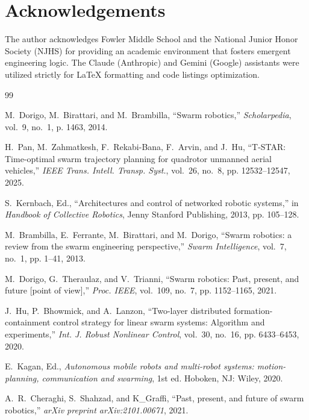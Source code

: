 \documentclass[letterpaper, 10pt, conference]{IEEEtran}
\begin{document}
\section*{Acknowledgements}
The author acknowledges Fowler Middle School and the National Junior Honor Society (NJHS) for providing an academic environment that fosters emergent engineering logic. The Claude (Anthropic) and Gemini (Google) assistants were utilized strictly for LaTeX formatting and code listings optimization.

\begin{thebibliography}{99}

M.~Dorigo, M.~Birattari, and M.~Brambilla, ``Swarm robotics,'' \emph{Scholarpedia}, vol.~9, no.~1, p. 1463, 2014.

H.~Pan, M.~Zahmatkesh, F.~Rekabi-Bana, F.~Arvin, and J.~Hu, ``T-STAR: Time-optimal swarm trajectory planning for quadrotor unmanned aerial vehicles,'' \emph{IEEE Trans. Intell. Transp. Syst.}, vol.~26, no.~8, pp. 12532--12547, 2025.

S.~Kernbach, Ed., ``Architectures and control of networked robotic systems,'' in \emph{Handbook of Collective Robotics}, Jenny Stanford Publishing, 2013, pp. 105--128.

M.~Brambilla, E.~Ferrante, M.~Birattari, and M.~Dorigo, ``Swarm robotics: a review from the swarm engineering perspective,'' \emph{Swarm Intelligence}, vol.~7, no.~1, pp. 1--41, 2013.

M.~Dorigo, G.~Theraulaz, and V.~Trianni, ``Swarm robotics: Past, present, and future [point of view],'' \emph{Proc. IEEE}, vol.~109, no.~7, pp. 1152--1165, 2021.

J.~Hu, P.~Bhowmick, and A.~Lanzon, ``Two-layer distributed formation-containment control strategy for linear swarm systems: Algorithm and experiments,'' \emph{Int. J. Robust Nonlinear Control}, vol.~30, no.~16, pp. 6433--6453, 2020.

E.~Kagan, Ed., \emph{Autonomous mobile robots and multi-robot systems: motion-planning, communication and swarming}, 1st ed. Hoboken, NJ: Wiley, 2020.

A.~R.~Cheraghi, S.~Shahzad, and K\_Graffi, ``Past, present, and future of swarm robotics,'' \emph{arXiv preprint arXiv:2101.00671}, 2021.


\end{thebibliography}
\end{document}
